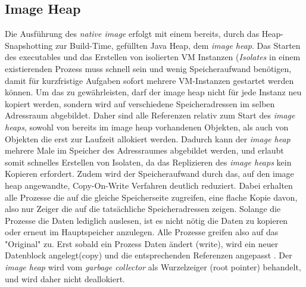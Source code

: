 \subsection{Image Heap}
\label{subsec:imageheap}

Die Ausführung des \textit{native image} erfolgt mit einem bereits, durch das Heap-Snapshotting zur Build-Time, gefüllten Java Heap,
dem \textit{image heap}. Das Starten des executables und das Erstellen von isolierten VM Instanzen (\textit{Isolates} in einem existierenden Prozess muss
schnell sein und wenig Speicheraufwand benötigen, damit für kurzfristige Aufgaben sofort mehrere VM-Instanzen gestartet werden können.
Um das zu gewährleisten, darf der image heap nicht für jede Instanz neu kopiert werden, sondern wird auf verschiedene Speicheradressen im selben Adressraum
abgebildet. Daher sind alle Referenzen relativ zum Start des \textit{image heaps}, sowohl von bereits im image heap vorhandenen Objekten, als auch von Objekten die 
erst zur Laufzeit allokiert werden. Dadurch kann der \textit{image heap} mehrere Male im Speicher des Adressraumes abgebildet werden, und erlaubt somit
schnelles Erstellen von Isolaten, da das Replizieren des \textit{image heaps} kein Kopieren erfordert. Zudem wird der Speicheraufwand durch das, auf den
image heap angewandte, Copy-On-Write Verfahren deutlich reduziert. Dabei erhalten alle Prozesse die auf die gleiche Speicherseite zugreifen, eine flache Kopie davon, also nur Zeiger die 
auf die tatsächliche Speicheradressen zeigen. Solange die Prozesse die Daten lediglich auslesen, ist es nicht nötig die Daten zu kopieren oder erneut im Hauptspeicher anzulegen. Alle Prozesse greifen also
auf das "Original" zu. Erst sobald ein Prozess Daten ändert (write), wird ein neuer Datenblock angelegt(copy) und die entsprechenden Referenzen angepasst \cite{bovet2002understanding}.
Der \textit{image heap} wird vom \textit{garbage collector} als Wurzelzeiger (root pointer) behandelt, und wird daher nicht deallokiert.
